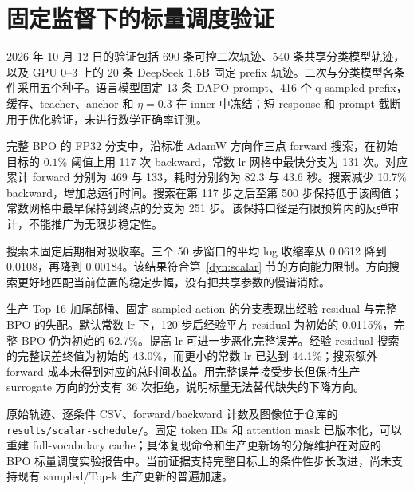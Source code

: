 \section{固定监督下的标量调度验证}
\label{evidence:scalar}

2026 年 10 月 12 日的验证包括 690 条可控二次轨迹、540 条共享分类模型轨迹，以及 GPU 0--3 上的 20 条 DeepSeek 1.5B 固定 prefix 轨迹。二次与分类模型各条件采用五个种子。语言模型固定 13 条 DAPO prompt、416 个 q-sampled prefix，缓存、teacher、anchor 和 $\eta=0.3$ 在 inner 中冻结；短 response 和 prompt 截断用于优化验证，未进行数学正确率评测。

完整 BPO 的 FP32 分支中，沿标准 AdamW 方向作三点 forward 搜索，在初始目标的 $0.1\%$ 阈值上用 117 次 backward，常数 lr 网格中最快分支为 131 次。对应累计 forward 分别为 469 与 133，耗时分别约为 82.3 与 43.6 秒。搜索减少 10.7\% backward，增加总运行时间。搜索在第 117 步之后至第 500 步保持低于该阈值；常数网格中最早保持到终点的分支为 251 步。该保持口径是有限预算内的反弹审计，不能推广为无限步稳定性。

搜索未固定后期相对吸收率。三个 50 步窗口的平均 log 收缩率从 0.0612 降到 0.0108，再降到 0.00184。该结果符合第~\ref{dyn:scalar} 节的方向能力限制。方向搜索更好地匹配当前位置的稳定步幅，没有把共享参数的慢谱消除。

生产 Top-16 加尾部桶、固定 sampled action 的分支表现出经验 residual 与完整 BPO 的失配。默认常数 lr 下，120 步后经验平方 residual 为初始的 0.0115\%，完整 BPO 仍为初始的 62.7\%。提高 lr 可进一步恶化完整误差。经验 residual 搜索的完整误差终值为初始的 43.0\%，而更小的常数 lr 已达到 44.1\%；搜索额外 forward 成本未得到对应的总时间收益。用完整误差接受步长但保持生产 surrogate 方向的分支有 36 次拒绝，说明标量无法替代缺失的下降方向。

原始轨迹、逐条件 CSV、forward/backward 计数及图像位于仓库的 \texttt{results/scalar-schedule/}。固定 token IDs 和 attention mask 已版本化，可以重建 full-vocabulary cache；具体复现命令和生产更新场的分解维护在对应的 BPO 标量调度实验报告中。当前证据支持完整目标上的条件性步长改进，尚未支持现有 sampled/Top-k 生产更新的普遍加速。
